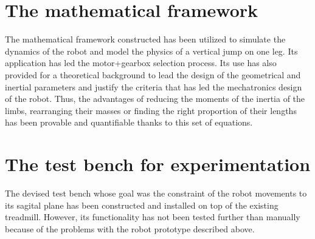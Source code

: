 \section{The mathematical framework} %
\label{sec:the_mathematical_framework}
The mathematical framework constructed has been utilized to simulate the dynamics of the robot and model the physics of a vertical jump on one leg.
Its application has led the motor+gearbox selection process.
Its use has also provided for a theoretical background to lead the design of the geometrical and inertial parameters and justify the criteria that has led the mechatronics design of the robot.
Thus, the advantages of reducing the moments of the inertia of the limbs, rearranging their masses or finding the right proportion of their lengths has been provable and quantifiable thanks to this set of equations.


\section{The test bench for experimentation} %
\label{sec:the_test_bench_2}
The devised test bench whose goal was the constraint of the robot movements to its sagital plane has been constructed and installed on top of the existing treadmill.
However, its functionality has not been tested further than manually because of the problems with the robot prototype described above.

